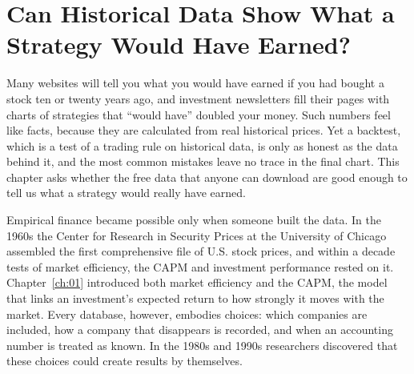 \makeatletter
{}
\makeatother

\chapter{Can Historical Data Show What a Strategy Would Have Earned?}
\label{ch:02}
\providecommand{\term}[1]{\emph{#1}}

Many websites will tell you what you would have earned if you had bought a stock ten or twenty years ago, and investment newsletters fill their pages with charts of strategies that ``would have'' doubled your money. Such numbers feel like facts, because they are calculated from real historical prices. Yet a backtest, which is a test of a trading rule on historical data, is only as honest as the data behind it, and the most common mistakes leave no trace in the final chart. This chapter asks whether the free data that anyone can download are good enough to tell us what a strategy would really have earned.

Empirical finance became possible only when someone built the data. In the 1960s the Center for Research in Security Prices at the University of Chicago assembled the first comprehensive file of U.S. stock prices, and within a decade tests of market efficiency, the CAPM and investment performance rested on it. Chapter~\ref{ch:01} introduced both market efficiency and the CAPM, the model that links an investment's expected return to how strongly it moves with the market. Every database, however, embodies choices: which companies are included, how a company that disappears is recorded, and when an accounting number is treated as known. In the 1980s and 1990s researchers discovered that these choices could create results by themselves.

